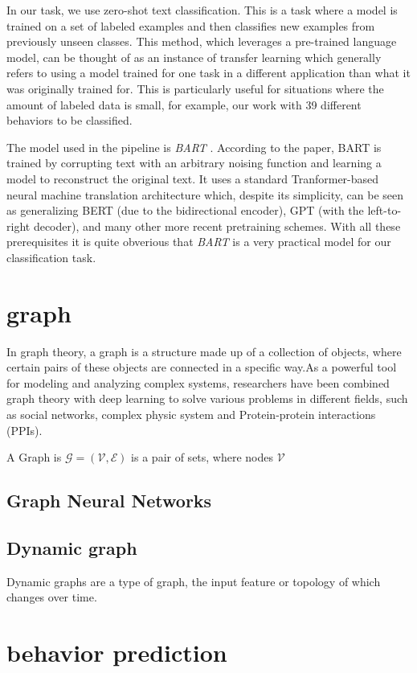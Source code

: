 In our task, we use zero-shot text classification. This is a task where a model is trained on a set of labeled examples and then classifies new examples from previously unseen classes. This method, which leverages a pre-trained language model, can be thought of as an instance of transfer learning which generally refers to using a model trained for one task in a different application than what it was originally trained for. This is particularly useful for situations where the amount of labeled data is small, for example, our work with 39 different behaviors to be classified.

The model used in the pipeline is \textit{BART} \cite{lewis2019bartdenoisingsequencetosequencepretraining}. According to the paper, BART is trained by corrupting text with an arbitrary noising function and learning a model to reconstruct the original text. It uses a standard Tranformer-based neural machine translation architecture which, despite its simplicity, can be seen as generalizing BERT (due to the bidirectional encoder), GPT (with the left-to-right decoder), and many other more recent pretraining schemes. With all these prerequisites it is quite obverious that \textit{BART} is a very practical model for our classification task.

\section{graph}
In graph theory, a graph is a structure made up of a collection of objects, where certain pairs of these objects are connected in a specific way\cite{zhou2020graph}.As a powerful tool for modeling and analyzing complex systems, researchers have been combined graph theory with deep learning to solve various problems in different fields, such as social networks\cite{wu2020graph}, complex physic system\cite{sanchez2018graph} and Protein-protein interactions (PPIs)\cite{NIPS2017_f5077839}.

A Graph is $\mathcal{G} = (\mathcal{V}, \mathcal{E})$ is a pair of sets, where nodes $\mathcal{V}$





    \subsection{Graph Neural Networks}

    \subsection{Dynamic graph}
Dynamic graphs are a type of graph, the input feature or topology of which changes over time.


    

\section{behavior prediction}



